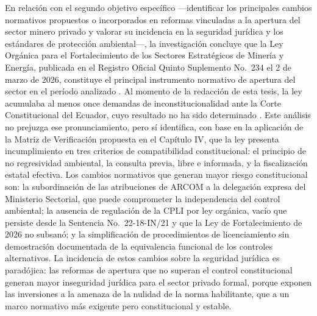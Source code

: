 En relación con el segundo objetivo específico —identificar los principales cambios normativos propuestos o incorporados en reformas vinculadas a la apertura del sector minero privado y valorar su incidencia en la seguridad jurídica y los estándares de protección ambiental—, la investigación concluye que la Ley Orgánica para el Fortalecimiento de los Sectores Estratégicos de Minería y Energía, publicada en el Registro Oficial Quinto Suplemento No.\ 234 el 2 de marzo de 2026, constituye el principal instrumento normativo de apertura del sector en el período analizado \parencite{ley_fortalecimiento_2026}. Al momento de la redacción de esta tesis, la ley acumulaba al menos once demandas de inconstitucionalidad ante la Corte Constitucional del Ecuador, cuyo resultado no ha sido determinado \parencite{primicias_demandas_2026}. Este análisis no prejuzga ese pronunciamiento, pero sí identifica, con base en la aplicación de la Matriz de Verificación propuesta en el Capítulo IV, que la ley presenta incumplimiento en tres criterios de compatibilidad constitucional: el principio de no regresividad ambiental, la consulta previa, libre e informada, y la fiscalización estatal efectiva. Los cambios normativos que generan mayor riesgo constitucional son: la subordinación de las atribuciones de ARCOM a la delegación expresa del Ministerio Sectorial, que puede comprometer la independencia del control ambiental; la ausencia de regulación de la CPLI por ley orgánica, vacío que persiste desde la Sentencia No.\ 22-18-IN/21 y que la Ley de Fortalecimiento de 2026 no subsanó; y la simplificación de procedimientos de licenciamiento sin demostración documentada de la equivalencia funcional de los controles alternativos. La incidencia de estos cambios sobre la seguridad jurídica es paradójica: las reformas de apertura que no superan el control constitucional generan mayor inseguridad jurídica para el sector privado formal, porque exponen las inversiones a la amenaza de la nulidad de la norma habilitante, que a un marco normativo más exigente pero constitucional y estable.


